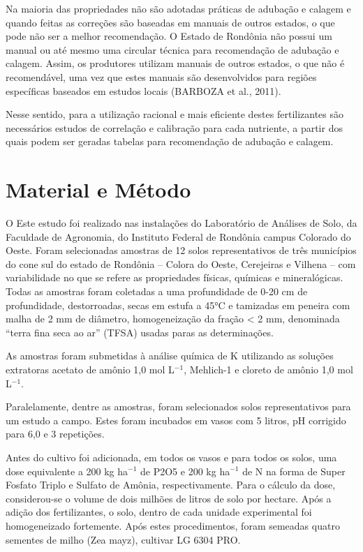 \documentclass[article,12pt,onesidea,4paper,english,brazil]{abntex2}
\begin{document}
	Na maioria das propriedades não são adotadas práticas de adubação e calagem e quando feitas as correções são baseadas em manuais de outros estados, o que pode não ser a melhor recomendação. O Estado de Rondônia não possui um manual ou até mesmo uma circular técnica para recomendação de adubação e calagem. Assim, os produtores utilizam manuais de outros estados, o que não é recomendável, uma vez que estes manuais são desenvolvidos para regiões específicas baseados em estudos locais (BARBOZA et al., 2011).
	
	Nesse sentido, para a utilização racional e mais eficiente destes fertilizantes são necessários estudos de correlação e calibração para cada nutriente, a partir dos quais podem ser geradas tabelas para recomendação de adubação e calagem.
	
	\section*{Material e Método}
	
	O Este estudo foi realizado nas instalações do Laboratório de Análises de Solo, da Faculdade de Agronomia, do Instituto Federal de Rondônia campus Colorado do Oeste. Foram selecionadas amostras de 12 solos representativos de três municípios do cone sul do estado de Rondônia – Colora do Oeste, Cerejeiras e Vilhena – com variabilidade no que se refere as propriedades físicas, químicas e mineralógicas. Todas as amostras foram coletadas a uma profundidade de 0-20 cm de profundidade, destorroadas, secas em estufa a 45°C e tamizadas em peneira com malha de 2 mm de diâmetro, homogeneização da fração < 2 mm, denominada “terra fina seca ao ar” (TFSA) usadas paras as determinações.
	
	As amostras foram submetidas à análise química de K utilizando as soluções extratoras acetato de amônio 1,0 mol L$^{-1}$, Mehlich-1 e cloreto de amônio 1,0 mol L$^{-1}$.
	
	Paralelamente, dentre as amostras, foram selecionados solos representativos para um estudo a campo. Estes foram incubados em vasos com 5 litros, pH corrigido para 6,0 e 3 repetições.
	
	Antes do cultivo foi adicionada, em todos os vasos e para todos os solos, uma dose equivalente a 200 kg ha$^{-1}$ de P2O5 e 200 kg ha$^{-1}$ de N na forma de Super Fosfato Triplo e Sulfato de Amônia, respectivamente. Para o cálculo da dose, considerou-se o volume de dois milhões de litros de solo por hectare. Após a adição dos fertilizantes, o solo, dentro de cada unidade experimental foi homogeneizado fortemente. Após estes procedimentos, foram semeadas quatro sementes de milho (Zea mayz), cultivar LG 6304 PRO.
	
\end{document}
